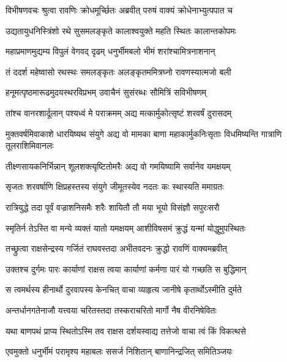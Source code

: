 
\twolineshloka
{विभीषणवचः श्रुत्वा रावणिः क्रोधमूर्च्छितः}
{अब्रवीत् परुषं वाक्यं क्रोधेनाभ्युत्पपात च} %

\twolineshloka
{उद्यतायुधनिस्त्रिंशो रथे सुसमलङ्कृते}
{कालाश्वयुक्ते महति स्थितः कालान्तकोपमः} %

\twolineshloka
{महाप्रमाणमुद्यम्य विपुलं वेगवद् दृढम्}
{धनुर्भीमबलो भीमं शरांश्चामित्रनाशनान्} %

\twolineshloka
{तं ददर्श महेष्वासो रथस्थः समलङ्कृतः}
{अलङ्कृतममित्रघ्नो रावणस्यात्मजो बली} %

\twolineshloka
{हनूमत्पृष्ठमारूढमुदयस्थरविप्रभम्}
{उवाचैनं सुसंरब्धः सौमित्रिं सविभीषणम्} %

\twolineshloka
{तांश्च वानरशार्दूलान् पश्यध्वं मे पराक्रमम्}
{अद्य मत्कार्मुकोत्सृष्टं शरवर्षं दुरासदम्} %

\threelineshloka
{मुक्तवर्षमिवाकाशे धारयिष्यथ संयुगे}
{अद्य वो मामका बाणा महाकार्मुकनिःसृताः}
{विधमिष्यन्ति गात्राणि तूलराशिमिवानलः} %

\twolineshloka
{तीक्ष्णसायकनिर्भिन्नान् शूलशक्त्यृष्टितोमरैः}
{अद्य वो गमयिष्यामि सर्वानेव यमक्षयम्} %

\twolineshloka
{सृजतः शरवर्षाणि क्षिप्रहस्तस्य संयुगे}
{जीमूतस्येव नदतः कः स्थास्यति ममाग्रतः} %

\twolineshloka
{रात्रियुद्धे तदा पूर्वं वज्राशनिसमैः शरैः}
{शायितौ तौ मया भूयो विसंज्ञौ सपुरःसरौ} %

\twolineshloka
{स्मृतिर्न तेऽस्ति वा मन्ये व्यक्तं यातो यमक्षयम्}
{आशीविषसमं क्रुद्धं यन्मां योद्धुमुपस्थितः} %

\twolineshloka
{तच्छ्रुत्वा राक्षसेन्द्रस्य गर्जितं राघवस्तदा}
{अभीतवदनः क्रुद्धो रावणिं वाक्यमब्रवीत्} %

\twolineshloka
{उक्तश्च दुर्गमः पारः कार्याणां राक्षस त्वया}
{कार्याणां कर्मणा पारं यो गच्छति स बुद्धिमान्} %

\twolineshloka
{स त्वमर्थस्य हीनार्थो दुरवापस्य केनचित्}
{वाचा व्याहृत्य जानीषे कृतार्थोऽस्मीति दुर्मते} %

\twolineshloka
{अन्तर्धानगतेनाजौ यत्त्वया चरितस्तदा}
{तस्कराचरितो मार्गो नैष वीरनिषेवितः} %

\twolineshloka
{यथा बाणपथं प्राप्य स्थितोऽस्मि तव राक्षस}
{दर्शयस्वाद्य तत्तेजो वाचा त्वं किं विकत्थसे} %

\twolineshloka
{एवमुक्तो धनुर्भीमं परामृश्य महाबलः}
{ससर्ज निशितान् बाणानिन्द्रजित् समितिञ्जयः} %

